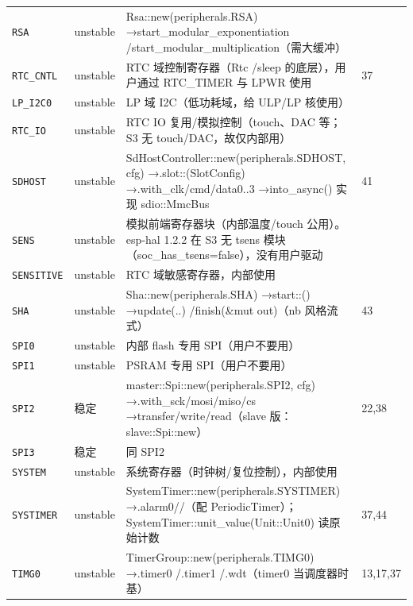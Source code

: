 \documentclass[UTF8,a4paper,11pt,fontset=fandol]{ctexart}
\newcommand{\fld}[1]{\texttt{#1}}
\begin{document}
\begin{center}
\begin{longtable}{@{}p{2.15cm}p{1.0cm}>{\raggedright\arraybackslash}p{9.4cm}p{1.65cm}@{}}
\fld{RSA} & unstable & Rsa::\allowbreak new(peripherals.RSA) →\allowbreak  start\_modular\_exponentiation /\allowbreak  start\_modular\_multiplication（需大缓冲） &  \\
\fld{RTC\_CNTL} & unstable & RTC 域控制寄存器（Rtc /\allowbreak  sleep 的底层），用户通过 RTC\_TIMER 与 LPWR 使用 & 37 \\
\fld{LP\_I2C0} & unstable & LP 域 I2C（低功耗域，给 ULP/\allowbreak LP 核使用） &  \\
\fld{RTC\_IO} & unstable & RTC IO 复用/\allowbreak 模拟控制（touch、DAC 等；S3 无 touch/\allowbreak DAC，故仅内部用） &  \\
\fld{SDHOST} & unstable & SdHostController::\allowbreak new(peripherals.SDHOST, cfg) →\allowbreak  .slot::(SlotConfig) →\allowbreak  .with\_clk/\allowbreak cmd/\allowbreak data0..3 →\allowbreak  into\_async() 实现 sdio::\allowbreak MmcBus & 41 \\
\fld{SENS} & unstable & 模拟前端寄存器块（内部温度/\allowbreak touch 公用）。esp-hal 1.2.2 在 S3 无 tsens 模块（soc\_has\_tsens=false），没有用户驱动 &  \\
\fld{SENSITIVE} & unstable & RTC 域敏感寄存器，内部使用 &  \\
\fld{SHA} & unstable & Sha::\allowbreak new(peripherals.SHA) →\allowbreak  start::() →\allowbreak  update(..) /\allowbreak  finish(\&mut out)（nb 风格流式） & 43 \\
\fld{SPI0} & unstable & 内部 flash 专用 SPI（用户不要用） &  \\
\fld{SPI1} & unstable & PSRAM 专用 SPI（用户不要用） &  \\
\fld{SPI2} & 稳定 & master::\allowbreak Spi::\allowbreak new(peripherals.SPI2, cfg) →\allowbreak  .with\_sck/\allowbreak mosi/\allowbreak miso/\allowbreak cs →\allowbreak  transfer/\allowbreak write/\allowbreak read（slave 版：slave::\allowbreak Spi::\allowbreak new） & 22,38 \\
\fld{SPI3} & 稳定 & 同 SPI2 &  \\
\fld{SYSTEM} & unstable & 系统寄存器（时钟树/\allowbreak 复位控制），内部使用 &  \\
\fld{SYSTIMER} & unstable & SystemTimer::\allowbreak new(peripherals.SYSTIMER) →\allowbreak  .alarm0/\allowbreak 1/\allowbreak 2（配 PeriodicTimer）；SystemTimer::\allowbreak unit\_value(Unit::\allowbreak Unit0) 读原始计数 & 37,44 \\
\fld{TIMG0} & unstable & TimerGroup::\allowbreak new(peripherals.TIMG0) →\allowbreak  .timer0 /\allowbreak  .timer1 /\allowbreak  .wdt（timer0 当调度器时基） & 13,17,37 \\

\end{longtable}
\end{center}
\end{document}

